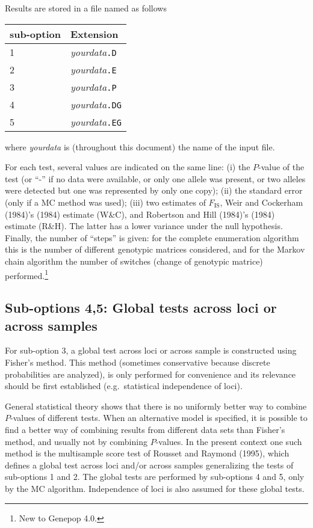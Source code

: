 \documentclass[12pt,]{book}
\let\rmarkdownfootnote\footnote%
\def\footnote{\protect\rmarkdownfootnote}
\begin{document}
Results are stored in a file named as follows

\begin{longtable}[]{@{}ll@{}}
\toprule
sub-option & Extension\tabularnewline
\midrule
\endhead
1 & \emph{yourdata}\texttt{.D}\tabularnewline
2 & \emph{yourdata}\texttt{.E}\tabularnewline
3 & \emph{yourdata}\texttt{.P}\tabularnewline
4 & \emph{yourdata}\texttt{.DG}\tabularnewline
5 & \emph{yourdata}\texttt{.EG}\tabularnewline
\bottomrule
\end{longtable}

where \emph{yourdata} is (throughout this document) the name of the
input file.

For each test, several values are indicated on the same line: (i) the
\(P\)-value of the test (or ``-'' if no data were available, or only one
allele was present, or two alleles were detected but one was represented
by only one copy); (ii) the standard error (only if a MC method was
used); (iii) two estimates of \(F_\mathrm{IS}\), Weir and Cockerham
(1984)'s (1984) estimate (W\&C), and Robertson and Hill (1984)'s (1984)
estimate (R\&H). The latter has a lower variance under the null
hypothesis. Finally, the number of ``steps'' is given: for the complete
enumeration algorithm this is the number of different genotypic matrices
considered, and for the Markov chain algorithm the number of
switches (change of genotypic
matrice) performed.\footnote{New to Genepop 4.0.}

\subsection{Sub-options 4,5: Global tests across loci or across
samples}\label{sub-options-45-global-tests-across-loci-or-across-samples}

For sub-option 3, a global test across loci or across sample is
constructed using Fisher's method.
This method (sometimes conservative because discrete probabilities are
analyzed), is only performed for convenience and its relevance should be
first established (e.g.~statistical independence of loci).

General statistical theory shows that there is no uniformly better way
to combine \(P\)-values of different tests. When an alternative model is
specified, it is possible to find a better way of combining results from
different data sets than Fisher's method, and usually not by combining
\(P\)-values. In the present context one such method is the multisample
score test of
Rousset and Raymond (1995), which defines a global test across loci
and/or across samples generalizing the tests of sub-options 1 and 2. The
global tests are performed by sub-options 4 and 5, only by the MC
algorithm. Independence of loci is also assumed for these global tests.
\end{document}
